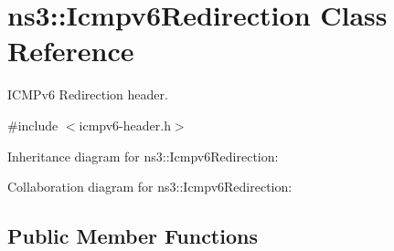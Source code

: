 \hypertarget{classns3_1_1Icmpv6Redirection}{}\section{ns3\+:\+:Icmpv6\+Redirection Class Reference}
\label{classns3_1_1Icmpv6Redirection}


I\+C\+M\+Pv6 Redirection header.  




{\ttfamily \#include $<$icmpv6-\/header.\+h$>$}



Inheritance diagram for ns3\+:\+:Icmpv6\+Redirection\+:


Collaboration diagram for ns3\+:\+:Icmpv6\+Redirection\+:
\subsection*{Public Member Functions}
